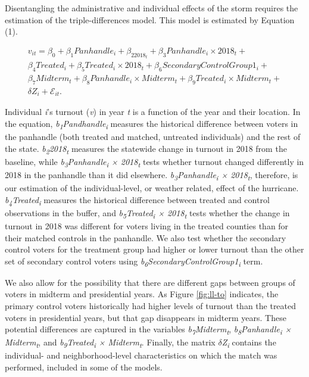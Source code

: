 \documentclass[
  12pt,
]{article}
\begin{document}
Disentangling the administrative and individual effects of the storm requires the estimation of the triple-differences model. This model is estimated by Equation (1).

\begin{gather}
\label{eq:1}
v_{it}=\beta_0+\beta_1Panhandle_{i}+\beta_22018_{t}+\beta_3Panhandle_{i}\times 2018_{t} + \nonumber \\
\beta_4Treated_{i} + \beta_5Treated_{i}\times 2018_{t} + \beta_6Secondary Control Group 1_{i} + \\
\beta_7Midterm_{t} + \beta_8Panhandle_{i}\times Midterm_{t} + \beta_9Treated_{i}\times Midterm_{t} + \nonumber \\
\delta{Z}_{i} + \mathcal{E}_{it}. \nonumber
\end{gather}

Individual \emph{i}'s turnout (\emph{v}) in year \emph{t} is a function of the year and their location. In the equation, \emph{b\textsubscript{1}Pandhandle\textsubscript{i}} measures the historical difference between voters in the panhandle (both treated and matched, untreated individuals) and the rest of the state. \emph{b\textsubscript{2}2018\textsubscript{t}} measures the statewide change in turnout in 2018 from the baseline, while \emph{b\textsubscript{3}Panhandle\textsubscript{i} × 2018\textsubscript{t}} tests whether turnout changed differently in 2018 in the panhandle than it did elsewhere. \emph{b\textsubscript{3}Panhandle\textsubscript{i} × 2018\textsubscript{t}}, therefore, is our estimation of the individual-level, or weather related, effect of the hurricane. \emph{b\textsubscript{4}Treated\textsubscript{i}} measures the historical difference between treated and control observations in the buffer, and \emph{b\textsubscript{5}Treated\textsubscript{i} × 2018\textsubscript{t}} tests whether the change in turnout in 2018 was different for voters living in the treated counties than for their matched controls in the panhandle. We also test whether the secondary control voters for the treatment group had higher or lower turnout than the other set of secondary control voters using \emph{b\textsubscript{6}SecondaryControlGroup1\textsubscript{i}} term.

We also allow for the possibility that there are different gaps between groups of voters in midterm and presidential years. As Figure \ref{fig:ll-to} indicates, the primary control voters historically had higher levels of turnout than the treated voters in presidential years, but that gap disappears in midterm years. These potential differences are captured in the variables \emph{b\textsubscript{7}Midterm\textsubscript{t}}, \emph{b\textsubscript{8}Panhandle\textsubscript{i} × Midterm\textsubscript{t}}, and \emph{b\textsubscript{9}Treated\textsubscript{i} × Midterm\textsubscript{t}}. Finally, the matrix \emph{\(\delta\)Z\textsubscript{i}} contains the individual- and neighborhood-level characteristics on which the match was performed, included in some of the models.
\end{document}
